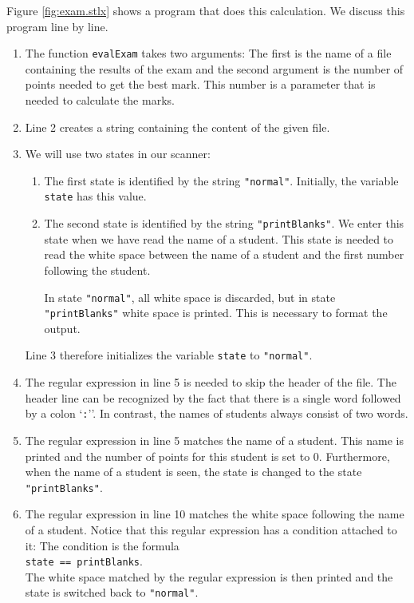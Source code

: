 Figure \ref{fig:exam.stlx} shows a program that does this calculation.  We discuss this
program line by line.
\begin{enumerate}
\item The function \texttt{evalExam} takes two arguments:  The first is the name of a file
      containing the results of the exam and the second argument is the number of points 
      needed to get the best mark.  This number is a parameter that is needed to calculate
      the marks.
\item Line 2 creates a string containing the content of the given file.
\item We will use two states in our scanner:
      \begin{enumerate}
      \item The first state is identified by the string \texttt{"normal"}.
            Initially, the variable \texttt{state} has this value.
      \item The second state is identified by the string \texttt{"printBlanks"}. 
            We enter this state when we have read the name of a student.
            This state is needed to read the white space between the name of a student 
            and the first number following the student.

            In state \texttt{"normal"}, all white space is discarded, but in state
            \texttt{"printBlanks"} white space is printed.  This is necessary to format
            the output.
      \end{enumerate}
      Line 3 therefore initializes the variable \texttt{state} to \texttt{"normal"}.
\item The regular expression in line 5 is needed to skip the header of the file.  The
      header line can be recognized by the fact that there is a single word followed by a colon
      `\texttt{:}''.   In contrast, the names of students always consist of two words.
\item The regular expression in line 5 matches the name of a student. 
      This name is printed and the number of points for this student is set to $0$.
      Furthermore, when the name of a student is seen, the state is changed to the state
      \texttt{"printBlanks"}.
\item The regular expression in line 10 matches the white space following the name of a
      student.  Notice that this regular expression has a condition attached to it: 
      The condition is the formula
      \\[0.2cm]
      \hspace*{1.3cm}
      \texttt{state == printBlanks}.
      \\[0.2cm]
      The white space matched by the regular expression is then printed and the state is switched back to
      \texttt{"normal"}.


\end{enumerate}
